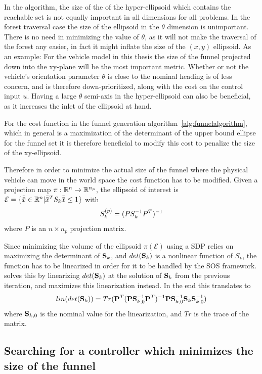 In the \rrtfunnel{} algorithm, the size of the of the hyper-ellipsoid which
contains the reachable set is not equally important in all dimensions for all
problems. In the forest traversal case the size of the ellipsoid in the
\(\theta\) dimension is unimportant. There is no need in minimizing the value of
\(\theta\), as it will not make the traversal of the forest any easier, in fact
it might inflate the size of the \((x,y)\) ellipsoid. As an example: For the
vehicle model in this thesis the size of the funnel projected down into the
xy-plane will be the most important metric. Whether or not the vehicle's
orientation parameter \(\theta\) is close to the nominal heading is of less
concern, and is therefore down-prioritized, along with the cost on the control
input \(u\). Having a large \(\theta\) semi-axis in the hyper-ellipsoid can also
be beneficial, as it increases the inlet of the ellipsoid at hand.

For the cost function in the funnel generation
algorithm~\cref{alg:funnelalgorithm}, which in general is a maximization of the
determinant of the upper bound ellipse for the funnel set it is therefore
beneficial to modify this cost to penalize the size of the xy-ellipsoid.

Therefore in order to minimize the actual size of the funnel where the physical
vehicle can move in the world space the cost function has to be modified. Given
a projection map \(\pi : \mathbb{R}^n \rightarrow \mathbb{R}^{n_p}\), the ellipsoid of interest
is \(\mathcal{E} = \lbrace\bar{\bar{x}} \in \mathbb{R}^n | \bar{\bar{x}}^TS_{k}\bar{\bar{x}} \leq 1\rbrace\)
with
\[
  S_k^{(p)} = \lparen PS_k^{-1}P^T\rparen^{-1}
\]
where \(P\) is an \(n\times n_p\) projection matrix.

Since minimizing the volume of the ellipsoid \(\pi(\mathcal{E})\) using a
\ac{SDP} relies on maximizing the determinant of \(\mathbf{S}_k\), and \(det( \mathbf{S}_k)\) is a
nonlinear function of \(S_k\), the function has to be linearized in order for it
to be handled by the \ac{SOS} framework.
\cite[Majumdar]{majumdarFunnelLibrariesRealtime2017} solves this by linearizing
\(det(\mathbf{S}_k)\) at the solution of \(\mathbf{S}_k\) from the previous iteration, and
maximizes this linearization instead. In the end this translates to
\[
  \mathnormal{lin}\lparen det\lparen \mathbf{S}_k\rparen\rparen = Tr\lparen \mathbf{P}^T\lparen \mathbf{P}
      \mathbf{S}_{k,0}^{-1} \mathbf{P}^T\rparen^{-1} \mathbf{P} \mathbf{S}_{k,0}^{-1}
    \mathbf{S}_k \mathbf{S}_{k,0}^{-1}\rparen
\]
where \( \mathbf{S}_{k,0}\) is the nominal value for the linearization, and \(Tr\) is the
trace of the matrix.

\subsection{Searching for a controller which minimizes the size of the funnel}
\label{subsec:searching-for-a-controller}

